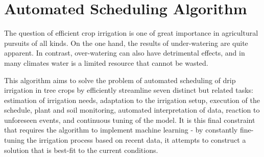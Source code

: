 \documentclass[]{article}
\begin{document}
\section{Automated Scheduling Algorithm}
The question of efficient crop irrigation is one of great importance in agricultural pursuits of all kinds. On the one hand, the results of under-watering are quite apparent. In contrast, over-watering can also have detrimental effects, and in many climates water is a limited resource that cannot be wasted.

This algorithm aims to solve the problem of automated scheduling of drip irrigation in tree crops by efficiently streamline seven distinct but related tasks: estimation of irrigation needs, adaptation to the irrigation setup, execution of the schedule, plant and soil monitoring, automated interpretation of data, reaction to unforeseen events, and continuous tuning of the model\cite[Casadesus 2012]{casadesus2012drip}. It is this final constraint that requires the algorithm to implement machine learning - by constantly fine-tuning the irrigation process based on recent data, it attempts to construct a solution that is best-fit to the current conditions.
\cite[Casadesus 2012]{casadesus2012drip}


\end{document}
